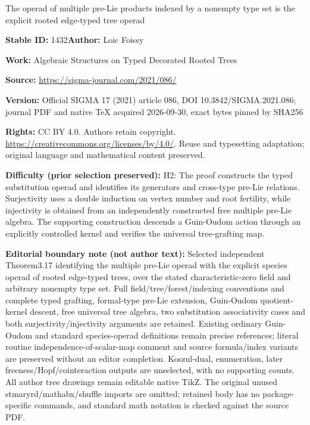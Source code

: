 \documentclass[11pt]{article}
\numberwithin{equation}{section}
\numberwithin{equation}{section}
\begin{document}
\begin{center}\Large The operad of multiple pre-Lie products indexed by a nonempty type set is the explicit rooted edge-typed tree operad\end{center}
\noindent\textbf{Stable ID:} 1432\quad\textbf{Author:} Loic Foissy\par
\noindent\textbf{Work:} Algebraic Structures on Typed Decorated Rooted Trees\par
\noindent\textbf{Source:} \url{https://sigma-journal.com/2021/086/}\par
\noindent\textbf{Version:} Official SIGMA 17 (2021) article 086, DOI 10.3842/SIGMA.2021.086; journal PDF and native TeX acquired 2026-09-30, exact bytes pinned by SHA256\par
\noindent\textbf{Rights:} CC BY 4.0. Authors retain copyright. \url{https://creativecommons.org/licenses/by/4.0/}. Reuse and typesetting adaptation; original language and mathematical content preserved.\par
\noindent\textbf{Difficulty (prior selection preserved):} {\CJKfont H2: The proof constructs the typed substitution operad and identifies its generators and cross-type pre-Lie relations. Surjectivity uses a double induction on vertex number and root fertility, while injectivity is obtained from an independently constructed free multiple pre-Lie algebra. The supporting construction descends a Guin-Oudom action through an explicitly controlled kernel and verifies the universal tree-grafting map.}\par
\medskip\noindent\textbf{Editorial boundary note (not author text):} Selected independent Theorem3.17 identifying the multiple pre-Lie operad with the explicit species operad of rooted edge-typed trees, over the stated characteristic-zero field and arbitrary nonempty type set. Full field/tree/forest/indexing conventions and complete typed grafting, formal-type pre-Lie extension, Guin-Oudom quotient-kernel descent, free universal tree algebra, two substitution associativity cases and both surjectivity/injectivity arguments are retained. Existing ordinary Guin-Oudom and standard species-operad definitions remain precise references; literal routine independence-of-scalar-map comment and source formula/index variants are preserved without an editor completion. Koszul-dual, enumeration, later freeness/Hopf/cointeraction outputs are unselected, with no supporting counts. All author tree drawings remain editable native TikZ. The original unused stmaryrd/mathabx/shuffle imports are omitted; retained body has no package-specific commands, and standard math notation is checked against the source PDF.\par
\end{document}
